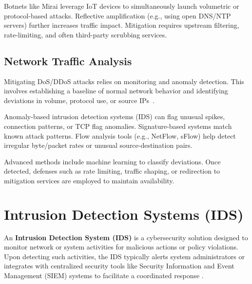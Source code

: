 \documentclass[16pt]{report}
\begin{document}
Botnets like Mirai leverage IoT devices to simultaneously launch volumetric or protocol-based attacks. Reflective amplification (e.g., using open DNS/NTP servers) further increases traffic impact. Mitigation requires upstream filtering, rate-limiting, and often third-party scrubbing services.

\subsection{Network Traffic Analysis}
Mitigating DoS/DDoS attacks relies on monitoring and anomaly detection. This involves establishing a baseline of normal network behavior and identifying deviations in volume, protocol use, or source IPs~\cite{fidelis_dos, mdpi_dos}.

Anomaly-based intrusion detection systems (IDS) can flag unusual spikes, connection patterns, or TCP flag anomalies. Signature-based systems match known attack patterns. Flow analysis tools (e.g., NetFlow, sFlow) help detect irregular byte/packet rates or unusual source-destination pairs.

Advanced methods include machine learning to classify deviations. Once detected, defenses such as rate limiting, traffic shaping, or redirection to mitigation services are employed to maintain availability.

\section{Intrusion Detection Systems (IDS)}
An \textbf{Intrusion Detection System (IDS)} is a cybersecurity solution designed to monitor network or system activities for malicious actions or policy violations. Upon detecting such activities, the IDS typically alerts system administrators or integrates with centralized security tools like Security Information and Event Management (SIEM) systems to facilitate a coordinated response \cite{ibm_ids}.
\end{document}
